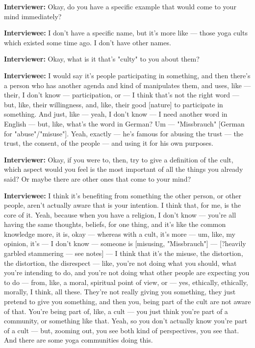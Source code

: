 \textbf{Interviewer:} Okay, do you have a specific example that would come to your mind immediately?

\textbf{Interviewee:} I don't have a specific name, but it's more like — those yoga cults which existed some time ago. I don't have other names.

\textbf{Interviewer:} Okay, what is it that's "culty" to you about them?

\textbf{Interviewee:} I would say it's people participating in something, and then there's a person who has another agenda and kind of manipulates them, and uses, like — their, I don't know — participation, or — I think that's not the right word — but, like, their willingness, and, like, their good [nature] to participate in something. And just, like — yeah, I don't know — I need another word in English — but, like, what's the word in German? Um — "Missbrauch" [German for "abuse"/"misuse"]. Yeah, exactly — he's famous for abusing the trust — the trust, the consent, of the people — and using it for his own purposes.

\textbf{Interviewer:} Okay, if you were to, then, try to give a definition of the cult, which aspect would you feel is the most important of all the things you already said? Or maybe there are other ones that come to your mind?

\textbf{Interviewee:} I think it's benefiting from something the other person, or other people, aren't actually aware that is your intention. I think that, for me, is the core of it. Yeah, because when you have a religion, I don't know — you're all having the same thoughts, beliefs, for one thing, and it's like the common knowledge more, it is, okay — whereas with a cult, it's more — um, like, my opinion, it's — I don't know — someone is [misusing, "Missbrauch"] — [?heavily garbled stammering — see notes] — I think that it's the misuse, the distortion, the distortion, the disrespect — like, you're not doing what you should, what you're intending to do, and you're not doing what other people are expecting you to do — from, like, a moral, spiritual point of view, or — yes, ethically, ethically, morally, I think, all these. They're not really giving you something, they just pretend to give you something, and then you, being part of the cult  are not aware of that. You're being part of, like, a cult — you just think you're part of a community, or something like that. Yeah, so you don't actually know you're part of a cult — but, zooming out, you see both kind of perspectives, you see that. And there are some yoga communities doing this.

